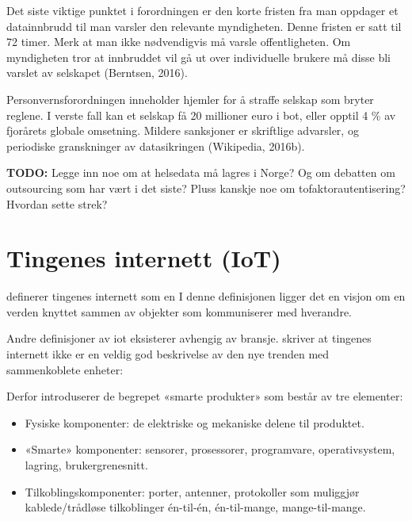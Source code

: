 Det siste viktige punktet i forordningen er den korte fristen fra man oppdager
et datainnbrudd til man varsler den relevante myndigheten. Denne fristen er
satt til 72 timer. Merk at man ikke nødvendigvis må varsle offentligheten. Om
myndigheten tror at innbruddet vil gå ut over individuelle brukere må disse
bli varslet av selskapet (Berntsen, 2016).

Personvernsforordningen inneholder hjemler for å straffe selskap som bryter reglene.
I verste fall kan et selskap få 20 millioner euro i
bot, eller opptil 4 \% av fjorårets globale omsetning.
Mildere sanksjoner er skriftlige advarsler, og periodiske
granskninger av datasikringen (Wikipedia, 2016b).

\textbf{TODO:} Legge inn noe om at helsedata må lagres i Norge? Og om debatten om outsourcing som har vært i det siste?
Pluss kanskje noe om tofaktorautentisering? Hvordan sette strek?


\section{Tingenes internett (IoT)}
\citet{iot_legal} definerer tingenes internett som en
 I denne definisjonen ligger det en
visjon om en verden knyttet sammen av objekter som kommuniserer med hverandre.

Andre definisjoner av \gls{iot} eksisterer avhengig av bransje. \citet{iot_harvard_smart} skriver
at tingenes internett ikke er en veldig god beskrivelse av den nye trenden med
sammenkoblete enheter: 

Derfor introduserer de begrepet «smarte produkter» som består av tre elementer:

 \begin{itemize}
    \item Fysiske komponenter: de elektriske og mekaniske delene til produktet.
    \item «Smarte» komponenter: sensorer, prosessorer, programvare, operativsystem, lagring, brukergrenesnitt.
    \item Tilkoblingskomponenter: porter, antenner, protokoller som muliggjør kablede/trådløse tilkoblinger
    én-til-én, én-til-mange, mange-til-mange.
\end{itemize}

